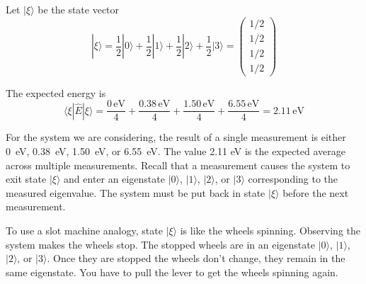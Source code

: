\documentclass[12pt]{article}
\begin{document}
\noindent
Let $|\xi\rangle$ be the state vector
\begin{equation*}
|\xi\rangle
=\frac{1}{2}|0\rangle+\frac{1}{2}|1\rangle+\frac{1}{2}|2\rangle+\frac{1}{2}|3\rangle
=\begin{pmatrix}1/2\\1/2\\1/2\\1/2\end{pmatrix}
\end{equation*}

\noindent
The expected energy is
\begin{equation*}
\langle\xi|\hat{E}|\xi\rangle
=\frac{0\,\text{eV}}{4}+\frac{0.38\,\text{eV}}{4}+\frac{1.50\,\text{eV}}{4}+\frac{6.55\,\text{eV}}{4}
=2.11\,\text{eV}
\end{equation*}

\noindent
For the system we are considering, the result of a single measurement is either
0~eV, 0.38~eV, 1.50~eV, or 6.55~eV.
The value 2.11 eV is the expected average across multiple measurements.
Recall that a measurement causes the system to exit state $|\xi\rangle$
and enter an eigenstate $|0\rangle$, $|1\rangle$, $|2\rangle$, or $|3\rangle$
corresponding to the measured eigenvalue.
The system must be put back in state $|\xi\rangle$ before the next measurement.

\bigskip
\noindent
To use a slot machine analogy, state $|\xi\rangle$ is like the wheels spinning.
Observing the system makes the wheels stop.
The stopped wheels are in an eigenstate $|0\rangle$, $|1\rangle$, $|2\rangle$, or $|3\rangle$.
Once they are stopped the wheels don't change, they remain in the same eigenstate.
You have to pull the lever to get the wheels spinning again.
\end{document}

